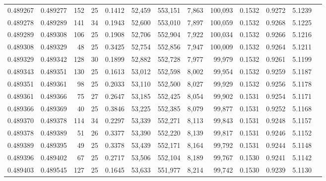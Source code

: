 \begin{tabular}{rrrrrrrrrrrrr}
0.489267 & 0.489277 & 152 &  25 &                                     0.1412 &  52,459 & 553,151 &   7,863 & 100,093 & 0.1532 & 0.9272 & 5.1239 \\
0.489278 & 0.489289 & 141 &  34 &                                     0.1943 &  52,600 & 553,010 &   7,897 & 100,059 & 0.1532 & 0.9268 & 5.1225 \\
0.489289 & 0.489308 & 106 &  25 &                                     0.1908 &  52,706 & 552,904 &   7,922 & 100,034 & 0.1532 & 0.9266 & 5.1216 \\
0.489308 & 0.489329 &  48 &  25 &                                     0.3425 &  52,754 & 552,856 &   7,947 & 100,009 & 0.1532 & 0.9264 & 5.1211 \\
0.489329 & 0.489342 & 128 &  30 &                                     0.1899 &  52,882 & 552,728 &   7,977 &  99,979 & 0.1532 & 0.9261 & 5.1199 \\
0.489343 & 0.489351 & 130 &  25 &                                     0.1613 &  53,012 & 552,598 &   8,002 &  99,954 & 0.1532 & 0.9259 & 5.1187 \\
0.489351 & 0.489361 &  98 &  25 &                                     0.2033 &  53,110 & 552,500 &   8,027 &  99,929 & 0.1532 & 0.9256 & 5.1178 \\
0.489361 & 0.489366 &  75 &  27 &                                     0.2647 &  53,185 & 552,425 &   8,054 &  99,902 & 0.1531 & 0.9254 & 5.1171 \\
0.489366 & 0.489369 &  40 &  25 &                                     0.3846 &  53,225 & 552,385 &   8,079 &  99,877 & 0.1531 & 0.9252 & 5.1168 \\
0.489370 & 0.489378 & 114 &  34 &                                     0.2297 &  53,339 & 552,271 &   8,113 &  99,843 & 0.1531 & 0.9248 & 5.1157 \\
0.489378 & 0.489389 &  51 &  26 &                                     0.3377 &  53,390 & 552,220 &   8,139 &  99,817 & 0.1531 & 0.9246 & 5.1152 \\
0.489389 & 0.489395 &  49 &  25 &                                     0.3378 &  53,439 & 552,171 &   8,164 &  99,792 & 0.1531 & 0.9244 & 5.1148 \\
0.489396 & 0.489402 &  67 &  25 &                                     0.2717 &  53,506 & 552,104 &   8,189 &  99,767 & 0.1530 & 0.9241 & 5.1142 \\
0.489403 & 0.489545 & 127 &  25 &                                     0.1645 &  53,633 & 551,977 &   8,214 &  99,742 & 0.1530 & 0.9239 & 5.1130 \\

\end{tabular}
